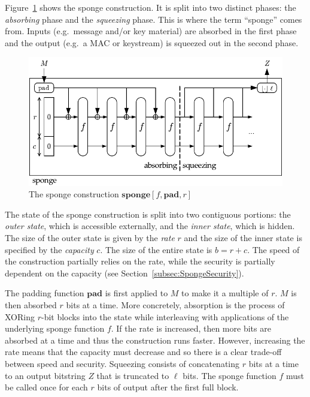 Figure~\hyperref[fig:Sponge]{\ref{fig:Sponge}} shows the sponge construction.
It is split into two distinct phases: the \emph{absorbing} phase and the \emph{squeezing} phase.
This is where the term ``sponge'' comes from.
Inputs (e.g.\ message and/or key material) are absorbed in the first phase and the output (e.g.\ a MAC or keystream) is squeezed out in the second phase.

\begin{figure}[ht]
\centering
\includegraphics[width=\textwidth]{img/Sponge.pdf}
\caption{The sponge construction $\mathbf{sponge}[f,\mathbf{pad},r]$ \cite{Bertoni2011_SpongeFunctions}}
\label{fig:Sponge}
\end{figure}

The state of the sponge construction is split into two contiguous portions: the \emph{outer state}, which is accessible externally, and the \emph{inner state}, which is hidden.
The size of the outer state is given by the \emph{rate} $r$ and the size of the inner state is specified by the \emph{capacity} $c$.
The size of the entire state is $b = r + c$.
The speed of the construction partially relies on the rate, while the security is partially dependent on the capacity (see Section~\ref{subsec:SpongeSecurity}).

The padding function $\mathbf{pad}$ is first applied to $M$ to make it a multiple of $r$.
$M$ is then absorbed $r$ bits at a time.
More concretely, absorption is the process of XORing $r$-bit blocks into the state while interleaving with applications of the underlying sponge function $f$.
If the rate is increased, then more bits are absorbed at a time and thus the construction runs faster.
However, increasing the rate means that the capacity must decrease and so there is a clear trade-off between speed and security.
Squeezing consists of concatenating $r$ bits at a time to an output bitstring $Z$ that is truncated to $\ell$ bits.
The sponge function $f$ must be called once for each $r$ bits of output after the first full block.

